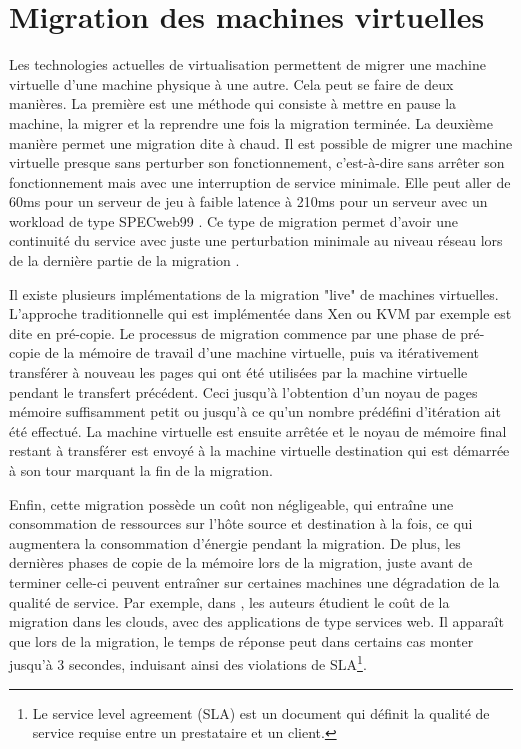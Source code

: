 \section{Migration des machines virtuelles}
\begin{onehalfspace}
Les technologies actuelles de virtualisation permettent de migrer une machine virtuelle d'une machine physique à une autre. Cela peut se faire de deux manières. La première est une méthode qui consiste à mettre en pause la machine, la migrer et la reprendre une fois la migration terminée. La deuxième manière permet une migration dite à chaud. Il est possible de migrer une machine virtuelle presque sans perturber son fonctionnement, c'est-à-dire sans arrêter son fonctionnement mais avec une interruption de service minimale. Elle peut aller de 60ms pour un serveur de jeu à faible latence à 210ms pour un serveur avec un workload de type SPECweb99 \cite{WEB29}. Ce type de migration permet d'avoir une continuité du service avec juste une perturbation minimale au niveau réseau lors de la dernière partie de la migration \cite{ref30}.\medskip

Il existe plusieurs implémentations de la migration "live" de machines virtuelles. L'approche traditionnelle qui est implémentée dans Xen ou KVM par exemple est dite en pré-copie. Le processus de migration commence par une phase de pré-copie de la mémoire de
travail d'une machine virtuelle, puis va itérativement transférer à nouveau les pages qui ont
été utilisées par la machine virtuelle pendant le transfert précédent. Ceci jusqu'à l'obtention d'un
noyau de pages mémoire suffisamment petit ou jusqu'à ce qu'un nombre prédéfini d'itération
ait été effectué. La machine virtuelle est ensuite arrêtée et le noyau de mémoire final restant
à transférer est envoyé à la machine virtuelle destination qui est démarrée à son tour
marquant la fin de la migration.\medskip

Enfin, cette migration possède un coût non négligeable, qui entraîne une consommation de ressources sur l'hôte source et destination à la fois, ce qui augmentera la consommation d'énergie pendant la migration. De plus, les dernières phases de copie de la mémoire lors de la migration, juste avant de terminer celle-ci peuvent entraîner sur certaines machines une dégradation de la qualité de service. Par exemple, dans \cite{ref31}, les auteurs étudient le coût de la migration dans les clouds, avec des applications de type services web. Il apparaît que lors de la migration, le temps de réponse peut dans certains cas monter jusqu'à 3 secondes, induisant ainsi des violations de SLA\footnote{Le service level agreement (SLA) est un document qui définit la qualité de service requise entre un prestataire et un client.}.\medskip


\end{onehalfspace}
